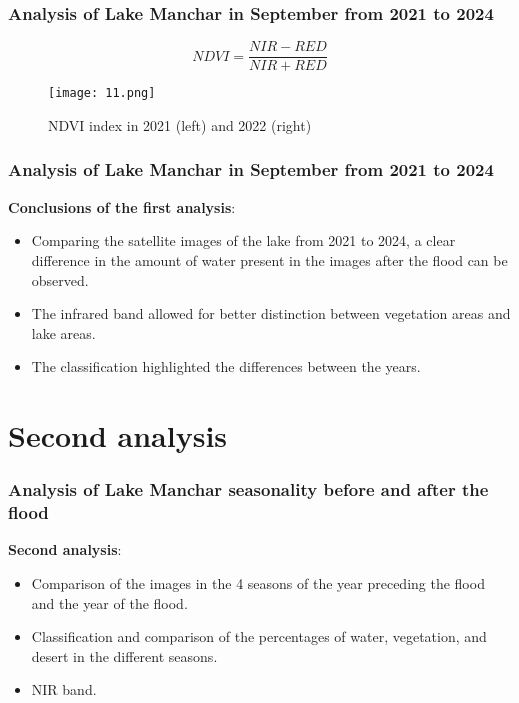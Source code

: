 \documentclass{beamer}
\begin{document}
\begin{frame}
  \frametitle{\small Analysis of Lake Manchar in September from 2021 to 2024} 

    \centering
    \small \begin{equation}
NDVI = \frac{NIR - RED}{NIR + RED}
\end{equation}
    
        \begin{figure}
        \centering
        \texttt{[image: 11.png]}
        \caption{NDVI index in 2021 (left) and 2022 (right)}
        \label{fig:enter-label}
    \end{figure}
  
\end{frame}

\begin{frame}
  \frametitle{\small Analysis of Lake Manchar in September from 2021 to 2024} 

    \small \textbf{Conclusions of the first analysis}:
    \begin{itemize}
        \item \small Comparing the satellite images of the lake from 2021 to 2024, a clear difference in the amount of water present in the images after the flood can be observed.
        \item \small The infrared band allowed for better distinction between vegetation areas and lake areas.
        \item \small The classification highlighted the differences between the years.
    \end{itemize} 
  
\end{frame}

\section{Second analysis}

\begin{frame}
  \frametitle{\small Analysis of Lake Manchar seasonality before and after the flood} 

  \small \textbf{Second analysis}:
  \begin{itemize}
      \item \small Comparison of the images in the 4 seasons of the year preceding the flood and the year of the flood.
      \item \small Classification and comparison of the percentages of water, vegetation, and desert in the different seasons.
      \item \small NIR band.
  \end{itemize}
  
\end{frame}
\end{document}
